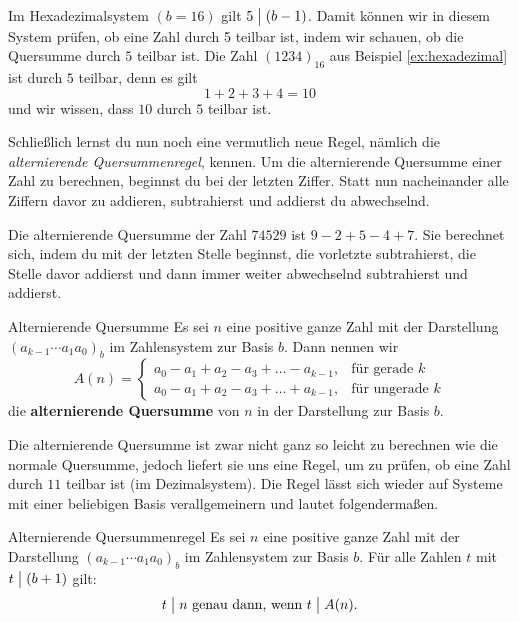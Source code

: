 \documentclass[../../main.tex]{subfiles}
\begin{document}
\begin{example}{}
    Im Hexadezimalsystem $(b=16)$ gilt $5\divides (b-1)$. Damit können wir in diesem System prüfen, ob eine Zahl durch 5
    teilbar ist, indem wir schauen, ob die Quersumme durch $5$ teilbar ist. Die Zahl $(1234)_{16}$ aus Beispiel
    \ref{ex:hexadezimal} ist durch $5$ teilbar, denn es gilt
    \[1+2+3+4=10\]
    und wir wissen, dass $10$ durch $5$ teilbar ist.
\end{example}
Schließlich lernst du nun noch eine vermutlich neue Regel, nämlich die \emph{alternierende Quersummenregel}, kennen. Um
die alternierende Quersumme einer Zahl zu berechnen, beginnst du bei der letzten Ziffer. Statt nun nacheinander alle
Ziffern davor zu addieren, subtrahierst und addierst du abwechselnd.
\begin{example}{}
    Die alternierende Quersumme der Zahl $74529$ ist $9-2+5-4+7$. Sie berechnet sich, indem du mit der letzten Stelle
    beginnst, die vorletzte subtrahierst, die Stelle davor addierst und dann immer weiter abwechselnd subtrahierst und
    addierst.
\end{example}
\begin{definition}{Alternierende Quersumme}
    Es sei $n$ eine positive ganze Zahl mit der Darstellung $(a_{k-1}\cdots a_1a_0)_b$ im Zahlensystem zur Basis $b$.
    Dann nennen wir
    \[A(n)=\begin{cases}
        a_0-a_1+a_2-a_3+\dots-a_{k-1}, &\text{für gerade }k\\
        a_0-a_1+a_2-a_3+\dots+a_{k-1}, &\text{für ungerade }k
    \end{cases}\]
    die \textbf{alternierende Quersumme} von $n$ in der Darstellung zur Basis $b$.
\end{definition}
Die alternierende Quersumme ist zwar nicht ganz so leicht zu berechnen wie die normale Quersumme, jedoch liefert sie uns
eine Regel, um zu prüfen, ob eine Zahl durch $11$ teilbar ist (im Dezimalsystem). Die Regel lässt sich wieder auf
Systeme mit einer beliebigen Basis verallgemeinern und lautet folgendermaßen.
\begin{theorem}{Alternierende Quersummenregel}
    Es sei $n$ eine positive ganze Zahl mit der Darstellung $(a_{k-1}\cdots a_1a_0)_b$ im Zahlensystem zur Basis $b$.
    Für alle Zahlen $t$ mit $t\divides (b+1)$ gilt:
    \[t\divides n\text{ genau dann, wenn }t\divides A(n).\]
\end{theorem}
\end{document}
